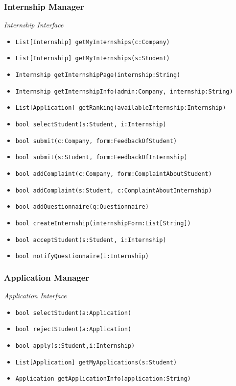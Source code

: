 \documentclass{article}
\begin{document}
\subsubsection{Internship Manager}
\textit{Internship Interface}
\begin{itemize}
    \item \texttt{List[Internship] getMyInternships(c:Company)}
    \item \texttt{List[Internship] getMyInternships(s:Student)}
    \item \texttt{Internship getInternshipPage(internship:String)}
    \item \texttt{Internship getInternshipInfo(admin:Company, internship:String)}
    \item \texttt{List[Application] getRanking(availableInternship:Internship)}
    \item \texttt{bool selectStudent(s:Student, i:Internship)}
    \item \texttt{bool submit(c:Company, form:FeedbackOfStudent)}
    \item \texttt{bool submit(s:Student, form:FeedbackOfInternship)}
    \item \texttt{bool addComplaint(c:Company, form:ComplaintAboutStudent)}
    \item \texttt{bool addComplaint(s:Student, c:ComplaintAboutInternship)}
    \item \texttt{bool addQuestionnaire(q:Questionnaire)}
    \item \texttt{bool createInternship(internshipForm:List[String])}
    \item \texttt{bool acceptStudent(s:Student, i:Internship)}
    \item \texttt{bool notifyQuestionnaire(i:Internship)}
\end{itemize}

\subsubsection{Application Manager}
\textit{Application Interface}
\begin{itemize}
    \item \texttt{bool selectStudent(a:Application)}
    \item \texttt{bool rejectStudent(a:Application)}
    \item \texttt{bool apply(s:Student,i:Internship)}
    \item \texttt{List[Application] getMyApplications(s:Student)}
    \item \texttt{Application getApplicationInfo(application:String)}
\end{itemize}
\end{document}
